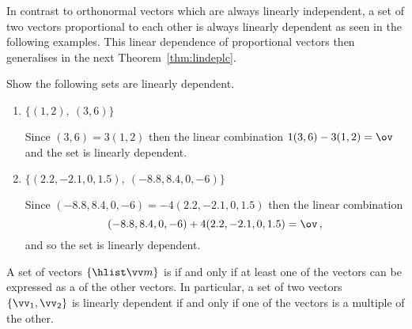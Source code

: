 In contrast to orthonormal vectors which are always linearly independent, a set of two vectors proportional to each other is always linearly dependent as seen in the following examples.
This linear dependence of proportional vectors then generalises in the next Theorem~\ref{thm:lindeplc}.
\begin{example} \label{eg:}
Show the following sets are linearly dependent.
\begin{enumerate}
\item \(\{(1,2),\ (3,6)\}\)
\begin{solution} 
Since \((3,6)=3(1,2)\) then the linear combination \(1(3,6)-3(1,2)=\ov\) and the set is linearly dependent. 
\end{solution}

\item \(\{(2.2,-2.1,0,1.5),\ (-8.8,8.4,0,-6)\}\)
\begin{solution} 
Since  \((-8.8,8.4,0,-6)=-4(2.2,-2.1,0,1.5)\) then the linear combination 
\begin{equation*}
(-8.8,8.4,0,-6)+4(2.2,-2.1,0,1.5)=\ov\,,
\end{equation*}
and so the set is linearly dependent.
\end{solution}
\end{enumerate}
\end{example}




\begin{theorem} \label{thm:lindeplc} 
A set of vectors \(\{\hlist\vv m\}\) is  if and only if at least one of the vectors can be expressed as a  of the other vectors.
In particular, a set of two vectors \(\{\vv_1,\vv_2\}\) is linearly dependent if and only if one of the vectors is a multiple of the other.
\end{theorem}

